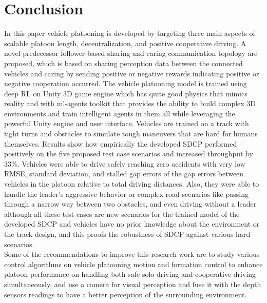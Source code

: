 \section{Conclusion}
In this paper vehicle platooning is developed by targeting three main aspects of scalable platoon length, decentralization, and positive cooperative driving. A novel predecessor follower-based sharing and caring communication topology are proposed, which is based on sharing perception data between the connected vehicles and caring by sending positive or negative rewards indicating positive or negative cooperation occurred. The vehicle platooning model is trained using deep RL on Unity 3D game engine which has quite good physics that mimics reality and with ml-agents toolkit that provides the ability to build complex 3D environments and train intelligent agents in them all while leveraging the powerful Unity engine and user interface. Vehicles are trained on a track with tight turns and obstacles to simulate tough maneuvers that are hard for humans themselves. Results show how empirically the developed SDCP performed positively on the five proposed test case scenarios and increased throughput by 33\%. Vehicles were able to drive safely reaching zero accidents with very low RMSE, standard deviation, and stalled gap errors of the gap errors between vehicles in the platoon relative to total driving distances. Also, they were able to handle the leader's aggressive behavior or complex road scenarios like passing through a narrow way between two obstacles, and even driving without a leader although all these test cases are new scenarios for the trained model of the developed SDCP and vehicles have no prior knowledge about the environment or the track design, and this proofs the robustness of SDCP against various hard scenarios.\\
Some of the recommendations to improve this research work are to study various control algorithms on vehicle platooning motion and formation control to enhance platoon performance on handling both safe solo driving and cooperative driving simultaneously, and use a camera for visual perception and fuse it with the depth sensors readings to have a better perception of the surrounding environment.

